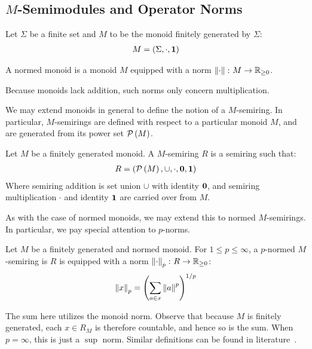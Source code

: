 
\subsection{\(M\)-Semimodules and Operator Norms}
Let \(\Sigma\) be a finite set and
\(M\) to be the monoid finitely generated by \(\Sigma\):
\begin{align*}
  M = \left(\Sigma, \cdot, \mathbf{1}\right)
\end{align*}

\begin{definition}
  A normed monoid is a monoid \(M\) equipped with a norm
  \(\left\lVert\cdot\right\rVert \colon M \to \mathbb{R}_{\geq 0}\).
\end{definition}

Because monoids lack addition,
such norms only concern multiplication.

We may extend monoids in general to define the notion of a \(M\)-semiring.
In particular,
\(M\)-semirings are defined with respect to a particular monoid \(M\),
and are generated from its power set \(\mathcal{P}\left(M\right)\).

\begin{definition}[\(M\)-Semiring]
  Let \(M\) be a finitely generated monoid.
  A \(M\)-semiring \(R\) is a semiring such that:
  \begin{align*}
    R = \left(\mathcal{P}\left(M\right), \cup, \cdot, \mathbf{0}, \mathbf{1}\right)
  \end{align*}
  Where semiring addition is set union \(\cup\) with identity \(\mathbf{0}\),
  and semiring multiplication \(\cdot\) and identity \(\mathbf{1}\)
  are carried over from \(M\).
\end{definition}

As with the case of normed monoids,
we may extend this to normed \(M\)-semirings.
In particular, we pay special attention to \(p\)-norms.

\begin{definition}
  Let \(M\) be a finitely generated and normed monoid.
  For \(1 \leq p \leq \infty\),
  a \(p\)-normed \(M\)-semiring is \(R\)
  is equipped with a norm \(\left\lVert\cdot\right\rVert_p \colon R \to \mathbb{R}_{\geq 0}\):
  \begin{align*}
    \left\lVert x\right\rVert_{p} = \left(\sum_{a \in x} \left\lVert a\right\rVert ^p\right)^{1/p}
  \end{align*}
\end{definition}

The sum here utilizes the monoid norm.
Observe that because \(M\) is finitely generated,
each \(x \in R_M\) is therefore countable,
and hence so is the sum.
When \(p = \infty\), this is just a \(\sup\) norm.
Similar definitions can be found in literature~\cite{kudlek2000lemmata}.

